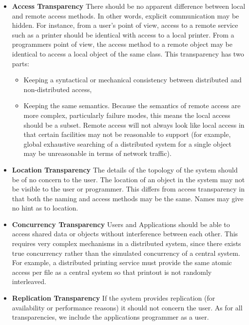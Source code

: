  \begin{itemize}
     \item  \textbf{Access Transparency} There should be no apparent difference between local and remote access methods. In other words, explicit communication may be hidden. For instance, from a user's point of view, access to a remote service such as a printer should be identical with access to a local printer. From a programmers point of view, the access method to a remote object may be identical to access a local object of the same class. This transparency has two parts: 
     \begin{itemize}
         \item  Keeping a syntactical or mechanical consistency between distributed and non-distributed access, \item  Keeping the same semantics. Because the semantics of remote access are more complex, particularly failure modes, this means the local access should be a subset. Remote access will not always look like local access in that certain facilities may not be reasonable to support (for example, global exhaustive searching of a distributed system for a single object may be unreasonable in terms of network traffic). 
     \end{itemize}
     \item  \textbf{Location Transparency} The details of the topology of the system should be of no concern to the user. The location of an object in the system may not be visible to the user or programmer. This differs from access transparency in that both the naming and access methods may be the same. Names may give no hint as to location. 
     \item  \textbf{Concurrency Transparency} Users and Applications should be able to access shared data or objects without interference between each other. This requires very complex mechanisms in a distributed system, since there exists true concurrency rather than the simulated concurrency of a central system. For example, a distributed printing service must provide the same atomic access per file as a central system so that printout is not randomly interleaved. 
     \item  \textbf{Replication Transparency} If the system provides replication (for availability or performance reasons) it should not concern the user. As for all transparencies, we include the applications programmer as a user. 

\end{itemize}
